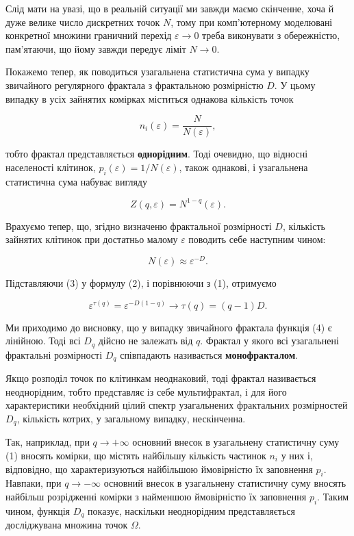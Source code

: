 \documentclass[
  letterpaper,
]{report}
\begin{document}
Слід мати на увазі, що в реальній ситуації ми завжди маємо скінченне,
хоча й дуже велике число дискретних точок \(N\), тому при комп'ютерному
моделювані конкретної множини граничний перехід \(\varepsilon\to 0\)
треба виконувати з обережністю, пам'ятаючи, що йому завжди передує ліміт
\(N \to 0\).

Покажемо тепер, як поводиться узагальнена статистична сума у випадку
звичайного регулярного фрактала з фрактальною розмірністю \(D\). У цьому
випадку в усіх зайнятих комірках міститься однакова кількість точок

\[
n_{i}(\varepsilon)=\frac{N}{N(\varepsilon)}, 
\]

тобто фрактал представляється \textbf{однорідним}. Тоді очевидно, що
відносні населеності клітинок, \(p_{i}(\varepsilon)=1/N(\varepsilon)\),
також однакові, і узагальнена статистична сума набуває вигляду

\[\tag{2}
Z(q,\varepsilon) = N^{1-q}(\varepsilon).
\]

Врахуємо тепер, що, згідно визначеню фрактальної розмірності \(D\),
кількість зайнятих клітинок при достатньо малому \(\varepsilon\)
поводить себе наступним чином:

\[\tag{3}
N(\varepsilon) \approx \varepsilon^{-D}.
\]

Підставляючи (3) у формулу (2), і порівнюючи з (1), отримуємо

\[\tag{4}
\varepsilon^{\tau(q)} = \varepsilon^{-D(1-q)} \to \tau(q)=(q-1)D. 
\]

Ми приходимо до висновку, що у випадку звичайного фрактала функція (4) є
лінійною. Тоді всі \(D_{q}\) дійсно не залежать від \(q\). Фрактал у
якого всі узагальнені фрактальні розмірності \(D_{q}\) співпадають
називається \textbf{монофракталом}.

Якщо розподіл точок по клітинкам неоднаковий, тоді фрактал називається
неоднорідним, тобто представляє із себе мультифрактал, і для його
характеристики необхідний цілий спектр узагальнених фрактальних
розмірностей \(D_{q}\), кількість котрих, у загальному випадку,
нескінченна.

Так, наприклад, при \(q \to +\infty\) основний внесок в узагальнену
статистичну суму (1) вносять комірки, що містять найбільшу кількість
частинок \(n_{i}\) у них і, відповідно, що характеризуються найбільшою
ймовірністю їх заповнення \(p_{i}\). Навпаки, при \(q \to -\infty\)
основний внесок в узагальнену статистичну суму вносять найбільш
розрідженні комірки з найменшою ймовірністю їх заповнення \(p_{i}\).
Таким чином, функція \(D_{q}\) показує, наскільки неоднорідним
представляється досліджувана множина точок \(\Omega\).
\end{document}

